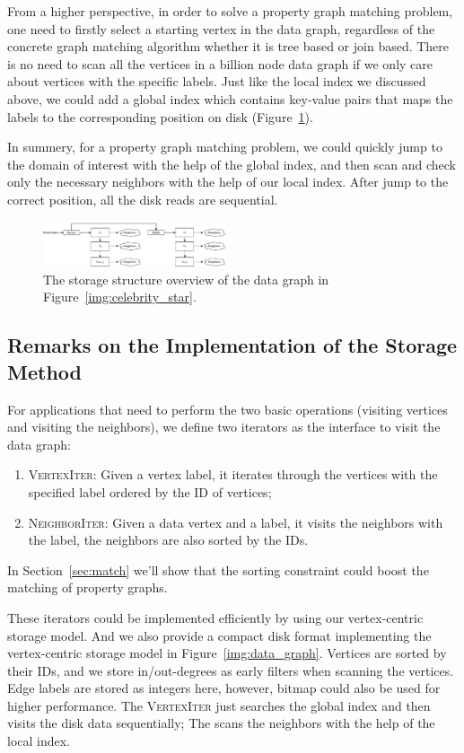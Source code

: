 From a higher perspective, in order to solve a property graph matching problem,
one need to firstly select a starting vertex in the data graph,
regardless of the concrete graph matching algorithm whether it is tree based or join based.
There is no need to scan all the vertices in a billion node data graph if we only care about vertices with the specific labels.
Just like the local index we discussed above, we could add a global index which contains key-value pairs that maps the labels to the corresponding position on disk (Figure~\ref{img:data_vertices}).

In summery, for a property graph matching problem, we could quickly jump to the domain of interest with the help of the global index, and then scan and check only the necessary neighbors with the help of our local index.
After jump to the correct position, all the disk reads are sequential.
\begin{figure}[ht]
  \centering
  \includegraphics[width=0.48\textwidth]{img/data_vertices.pdf}
  \caption{The storage structure overview of the data graph in Figure~\ref{img:celebrity_star}.}\label{img:data_vertices}
\end{figure}
\subsection{Remarks on the Implementation of the Storage Method}\label{sec:storage_iterators}
For applications that need to perform the two basic operations (visiting vertices and visiting the neighbors),
we define two iterators as the interface to visit the data graph:
\begin{enumerate}[noitemsep]
\item \textsc{VertexIter}: Given a vertex label, it iterates through the vertices with the specified label ordered by the ID of vertices;
\item \textsc{NeighborIter}: Given a data vertex and a label, it visits the neighbors with the label, the neighbors are also sorted by the IDs.
\end{enumerate}
In Section~\ref{sec:match} we'll show that the sorting constraint could boost the matching of property graphs.

These iterators could be implemented efficiently by using our vertex-centric storage model.
And we also provide a compact disk format implementing the vertex-centric storage model in Figure~\ref{img:data_graph}.
Vertices are sorted by their IDs, and we store in/out-degrees as early filters when scanning the vertices.
Edge labels are stored as integers here, however, bitmap could also be used for higher performance.
The \textsc{VertexIter} just searches the global index and then visits the disk data sequentially;
The  scans the neighbors with the help of the local index.

